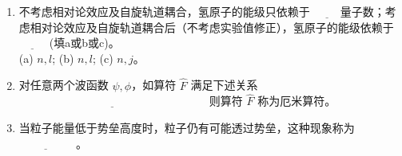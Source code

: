 \begin{enumerate}
    \item 不考虑相对论效应及自旋轨道耦合，氢原子的能级只依赖于 $\underline{\hspace{1cm}}$量子数；考虑相对论效应及自旋轨道耦合后（不考虑实验值修正），氢原子的能级依赖于 $\underline{\hspace{1cm}}$ (填a或b或c)。\\
   (a) $n, l$;  (b) $n, l$;  (c) $n, j$。
    \item 对任意两个波函数 $\psi, \phi$，如算符 $\hat{F}$ 满足下述关系 $\underline{\hspace{7cm}}$ 则算符 $\hat{F}$ 称为厄米算符。

    \item 当粒子能量低于势垒高度时，粒子仍有可能透过势垒，这种现象称为$\underline{\hspace{2cm}}$ 。
\end{enumerate}